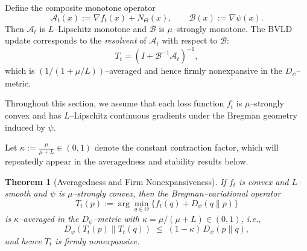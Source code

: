 \documentclass[11pt]{article}
\theoremstyle{plain}
\newtheorem{theorem}{Theorem}[section]
\theoremstyle{definition}
\theoremstyle{remark}
\begin{document}

Define the composite monotone operator
\begin{equation}
\mathcal A_t(x):=\nabla f_t(x)+N_\Theta(x),
\qquad
\mathcal B(x):=\nabla\psi(x).
\label{eq:operators}
\end{equation}
Then $\mathcal A_t$ is $L$–Lipschitz monotone and $\mathcal B$ is 
$\mu$–strongly monotone.  
The BVLD update corresponds to the \emph{resolvent} of $\mathcal A_t$ 
with respect to $\mathcal B$:
\begin{equation}
T_t=(I+\mathcal B^{-1}\mathcal A_t)^{-1},
\label{eq:resolvent}
\end{equation}
which is $(1/(1+\mu/L))$–averaged and hence firmly nonexpansive 
in the $D_\psi$–metric.

Throughout this section, we assume that each loss function $f_t$ is $\mu$–strongly convex 
and has $L$–Lipschitz continuous gradients under the Bregman geometry induced by $\psi$.

\noindent
Let \(\kappa := \frac{\mu}{\mu+L}\in(0,1)\) denote the constant contraction factor,
which will repeatedly appear in the averagedness and stability results below.


\begin{theorem}[Averagedness and Firm Nonexpansiveness]
\label{thm:averaged}
If $f_t$ is convex and $L$–smooth and $\psi$ is $\mu$–strongly convex,
then the Bregman–variational operator
\[
T_t(p):=\arg\min_{q\in\Theta}\{f_t(q)+D_\psi(q\|p)\}
\]
is $\kappa$–averaged in the $D_\psi$–metric with
$\kappa=\mu/(\mu+L)\in(0,1)$, i.e.,
\begin{equation}
D_\psi(T_t(p)\|T_t(q))
\;\le\;(1-\kappa)\,D_\psi(p\|q),
\label{eq:averaged}
\end{equation}
and hence $T_t$ is firmly nonexpansive.
\end{theorem}
\end{document}
